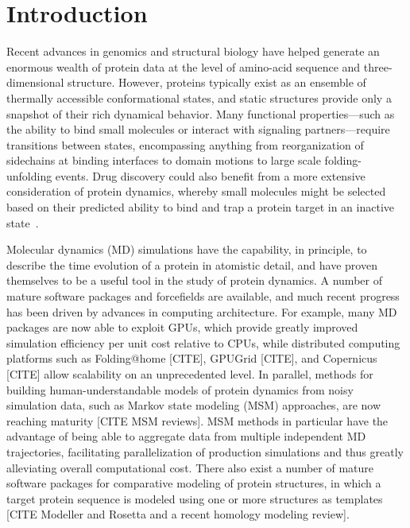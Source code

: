 \documentclass[aps,pre,twocolumn,nofootinbib,superscriptaddress,linenumbers]{revtex4-1}
\begin{document}
\maketitle

\section{Introduction}
\label{section:introduction}

Recent advances in genomics and structural biology have helped generate an enormous wealth of protein data at the level of amino-acid sequence and three-dimensional structure.
However, proteins typically exist as an ensemble of thermally accessible conformational states, and static structures provide only a snapshot of their rich dynamical behavior.
Many functional properties---such as the ability to bind small molecules or interact with signaling partners---require transitions between states, encompassing anything from reorganization of sidechains at binding interfaces to domain motions to large scale folding-unfolding events.
Drug discovery could also benefit from a more extensive consideration of protein dynamics, whereby small molecules might be selected based on their predicted ability to bind and trap a protein target in an inactive state~\cite{craik:2009:science:trapping-moving-targets}.

Molecular dynamics (MD) simulations have the capability, in principle, to describe the time evolution of a protein in atomistic detail, and have proven themselves to be a useful tool in the study of protein dynamics.
A number of mature software packages and forcefields are available, and much recent progress has been driven by advances in computing architecture.
For example, many MD packages are now able to exploit GPUs, which provide greatly improved simulation efficiency per unit cost relative to CPUs, while distributed computing platforms such as Folding@home [CITE], GPUGrid [CITE], and Copernicus [CITE] allow scalability on an unprecedented level.
In parallel, methods for building human-understandable models of protein dynamics from noisy simulation data, such as Markov state modeling (MSM) approaches, are now reaching maturity [CITE MSM reviews].
MSM methods in particular have the advantage of being able to aggregate data from multiple independent MD trajectories, facilitating parallelization of production simulations and thus greatly alleviating overall computational cost.
There also exist a number of mature software packages for comparative modeling of protein structures, in which a target protein sequence is modeled using one or more structures as templates [CITE Modeller and Rosetta and a recent homology modeling review].
\end{document}
